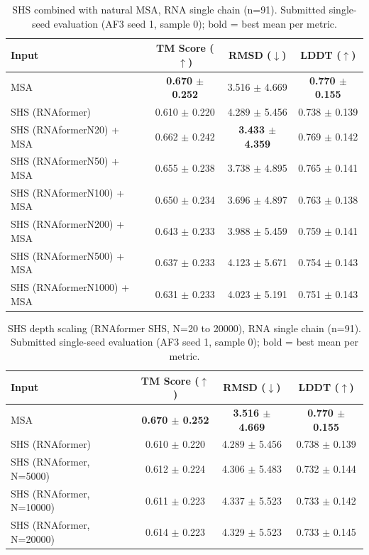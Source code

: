 \begin{table}[htbp]
\centering
\caption{SHS combined with natural MSA, RNA single chain (n=91). Submitted single-seed evaluation (AF3 seed 1, sample 0); bold = best mean per metric.}
\label{tab:shs_and_msa_depth_sweep}
\begin{tabular}{lccc}
\toprule
Input & TM Score ($\uparrow$) & RMSD ($\downarrow$) & LDDT ($\uparrow$) \\
\midrule
MSA & \textbf{0.670 $\pm$ 0.252} & 3.516 $\pm$ 4.669 & \textbf{0.770 $\pm$ 0.155} \\
SHS (RNAformer) & 0.610 $\pm$ 0.220 & 4.289 $\pm$ 5.456 & 0.738 $\pm$ 0.139 \\
SHS (RNAformerN20) + MSA & 0.662 $\pm$ 0.242 & \textbf{3.433 $\pm$ 4.359} & 0.769 $\pm$ 0.142 \\
SHS (RNAformerN50) + MSA & 0.655 $\pm$ 0.238 & 3.738 $\pm$ 4.895 & 0.765 $\pm$ 0.141 \\
SHS (RNAformerN100) + MSA & 0.650 $\pm$ 0.234 & 3.696 $\pm$ 4.897 & 0.763 $\pm$ 0.138 \\
SHS (RNAformerN200) + MSA & 0.643 $\pm$ 0.233 & 3.988 $\pm$ 5.459 & 0.759 $\pm$ 0.141 \\
SHS (RNAformerN500) + MSA & 0.637 $\pm$ 0.233 & 4.123 $\pm$ 5.671 & 0.754 $\pm$ 0.143 \\
SHS (RNAformerN1000) + MSA & 0.631 $\pm$ 0.233 & 4.023 $\pm$ 5.191 & 0.751 $\pm$ 0.143 \\
\bottomrule
\end{tabular}
\end{table}

\begin{table}[htbp]
\centering
\caption{SHS depth scaling (RNAformer SHS, N=20 to 20000), RNA single chain (n=91). Submitted single-seed evaluation (AF3 seed 1, sample 0); bold = best mean per metric.}
\label{tab:rna_single_chain_scaling}
\begin{tabular}{lccc}
\toprule
Input & TM Score ($\uparrow$) & RMSD ($\downarrow$) & LDDT ($\uparrow$) \\
\midrule
MSA & \textbf{0.670 $\pm$ 0.252} & \textbf{3.516 $\pm$ 4.669} & \textbf{0.770 $\pm$ 0.155} \\
SHS (RNAformer) & 0.610 $\pm$ 0.220 & 4.289 $\pm$ 5.456 & 0.738 $\pm$ 0.139 \\
SHS (RNAformer, N=5000) & 0.612 $\pm$ 0.224 & 4.306 $\pm$ 5.483 & 0.732 $\pm$ 0.144 \\
SHS (RNAformer, N=10000) & 0.611 $\pm$ 0.223 & 4.337 $\pm$ 5.523 & 0.733 $\pm$ 0.142 \\
SHS (RNAformer, N=20000) & 0.614 $\pm$ 0.223 & 4.329 $\pm$ 5.523 & 0.733 $\pm$ 0.145 \\
\bottomrule
\end{tabular}
\end{table}

